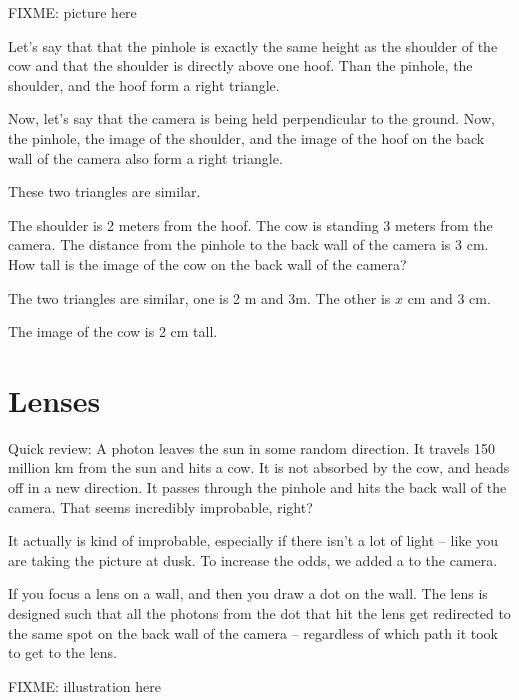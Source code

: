 FIXME: picture here

\begin{Exercise}[title={Height of the image}, label=image_height]

Let's say that that the pinhole is exactly the same height as the
shoulder of the cow and that the shoulder is directly above one hoof.
Than the pinhole, the shoulder, and the hoof form a right triangle.

Now, let's say that the camera is being held perpendicular to the
ground.  Now, the pinhole, the image of the shoulder, and the image of
the hoof on the back wall of the camera also form a right triangle.

These two triangles are similar.

The shoulder is 2 meters from the hoof.  The cow is standing 3 meters
from the camera.  The distance from the pinhole to the back wall of
the camera is 3 cm.  How tall is the image of the cow on the back wall
of the camera?

\end{Exercise}
\begin{Answer}[ref=image_height]

The two triangles are similar, one is 2 m and 3m.  The other is $x$ cm and 3 cm.

The image of the cow is 2 cm tall.

\end{Answer}

\section{Lenses}

Quick review: A photon leaves the sun in some random direction. It
travels 150 million km from the sun and hits a cow.  It is not
absorbed by the cow, and heads off in a new direction.  It passes
through the pinhole and hits the back wall of the camera.  That seems
incredibly improbable, right?

It actually is kind of improbable, especially if there isn't a lot of
light -- like you are taking the picture at dusk.  To increase the
odds, we added a  to the camera.

If you focus a lens on a wall, and then you draw a dot on the
wall. The lens is designed such that all the photons from the dot that
hit the lens get redirected to the same spot on the back wall of the
camera -- regardless of which path it took to get to the lens.

FIXME: illustration here

